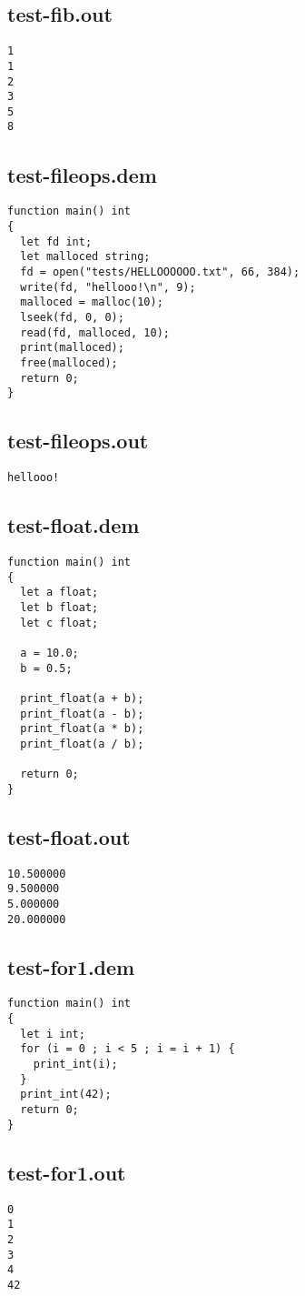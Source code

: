\subsection{test-fib.out}
\begin{lstlisting}
1
1
2
3
5
8
\end{lstlisting}
\subsection{test-fileops.dem}
\begin{lstlisting}
function main() int
{
  let fd int;
  let malloced string;
  fd = open("tests/HELLOOOOOO.txt", 66, 384);
  write(fd, "hellooo!\n", 9);
  malloced = malloc(10);
  lseek(fd, 0, 0);
  read(fd, malloced, 10);
  print(malloced);
  free(malloced);
  return 0;
}
\end{lstlisting}
\subsection{test-fileops.out}
\begin{lstlisting}
hellooo!
\end{lstlisting}
\subsection{test-float.dem}
\begin{lstlisting}
function main() int
{
  let a float;
  let b float;
  let c float;

  a = 10.0;
  b = 0.5;

  print_float(a + b);
  print_float(a - b);
  print_float(a * b);
  print_float(a / b);  

  return 0;
}
\end{lstlisting}
\subsection{test-float.out}
\begin{lstlisting}
10.500000
9.500000
5.000000
20.000000
\end{lstlisting}
\subsection{test-for1.dem}
\begin{lstlisting}
function main() int
{
  let i int;
  for (i = 0 ; i < 5 ; i = i + 1) {
    print_int(i);
  }
  print_int(42);
  return 0;
}
\end{lstlisting}
\subsection{test-for1.out}
\begin{lstlisting}
0
1
2
3
4
42
\end{lstlisting}
